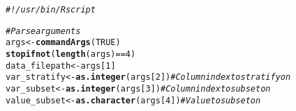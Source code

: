 \documentclass{article}\usepackage[]{graphicx}\usepackage[]{color}
\makeatletter
\newcommand{\hlnum}[1]{\textcolor[rgb]{0.686,0.059,0.569}{#1}}%
\newcommand{\hlcom}[1]{\textcolor[rgb]{0.678,0.584,0.686}{\textit{#1}}}%
\newcommand{\hlopt}[1]{\textcolor[rgb]{0,0,0}{#1}}%
\newcommand{\hlstd}[1]{\textcolor[rgb]{0.345,0.345,0.345}{#1}}%
\newcommand{\hlkwb}[1]{\textcolor[rgb]{0.69,0.353,0.396}{#1}}%
\newcommand{\hlkwd}[1]{\textcolor[rgb]{0.737,0.353,0.396}{\textbf{#1}}}%
\newenvironment{kframe}{%
 \def\at@end@of@kframe{}%
 \ifinner\ifhmode%
  \def\at@end@of@kframe{\end{minipage}}%
  \begin{minipage}{\columnwidth}%
 \fi\fi%
 \def\FrameCommand##1{\hskip\@totalleftmargin \hskip-\fboxsep
 \colorbox{shadecolor}{##1}\hskip-\fboxsep
     \hskip-\linewidth \hskip-\@totalleftmargin \hskip\columnwidth}%
 \MakeFramed {\advance\hsize-\width
   \@totalleftmargin\z@ \linewidth\hsize
   \@setminipage}}%
 {\par\unskip\endMakeFramed%
 \at@end@of@kframe}
\newenvironment{knitrout}{}{} %
\makeatother
\begin{document}
\begin{knitrout}
\color{fgcolor}\begin{kframe}
\begin{alltt}
 \hlcom{#!/usr/bin/Rscript}

 \hlcom{# Parse arguments}
 \hlstd{args} \hlkwb{<-} \hlkwd{commandArgs}\hlstd{(}\hlnum{TRUE}\hlstd{)}
 \hlkwd{stopifnot}\hlstd{(}\hlkwd{length}\hlstd{(args)} \hlopt{==} \hlnum{4}\hlstd{)}
 \hlstd{data_filepath} \hlkwb{<-} \hlstd{args[}\hlnum{1}\hlstd{]}
 \hlstd{var_stratify} \hlkwb{<-} \hlkwd{as.integer}\hlstd{(args[}\hlnum{2}\hlstd{])} \hlcom{# Column index to stratify on}
 \hlstd{var_subset} \hlkwb{<-} \hlkwd{as.integer}\hlstd{(args[}\hlnum{3}\hlstd{])} \hlcom{# Column index to subset on}
 \hlstd{value_subset} \hlkwb{<-} \hlkwd{as.character}\hlstd{(args[}\hlnum{4}\hlstd{])} \hlcom{# Value to subset on}


\end{alltt}
\end{kframe}
\end{knitrout}
\end{document}
